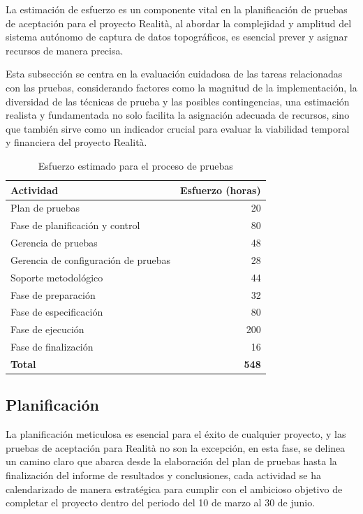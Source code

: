 \documentclass[12pt,a4paper, twoside]{article} %
\begin{document}
La estimación de esfuerzo es un componente vital en la planificación de pruebas de aceptación para el proyecto Realità, al abordar la complejidad y amplitud del sistema autónomo de captura de datos topográficos, es esencial prever y asignar recursos de manera precisa.

Esta subsección se centra en la evaluación cuidadosa de las tareas relacionadas con las pruebas, considerando factores como la magnitud de la implementación, la diversidad de las técnicas de prueba y las posibles contingencias, una estimación realista y fundamentada no solo facilita la asignación adecuada de recursos, sino que también sirve como un indicador crucial para evaluar la viabilidad temporal y financiera del proyecto Realità.

\begin{table}[h]
\centering
\begin{tabular}{|l |r|}
\hline
\textbf{Actividad} & \textbf{Esfuerzo (horas)} \\
\hline
Plan de pruebas & 20 \\
Fase de planificación y control & 80 \\
Gerencia de pruebas & 48 \\
Gerencia de configuración de pruebas & 28 \\
Soporte metodológico & 44 \\
Fase de preparación & 32 \\
Fase de especificación & 80 \\
Fase de ejecución & 200 \\
Fase de finalización & 16 \\
\hline
\textbf{Total} & \textbf{548} \\
\hline
\end{tabular}
\caption{Esfuerzo estimado para el proceso de pruebas}
\label{tab:estimated_effort}
\end{table}


\subsection{Planificación}

La planificación meticulosa es esencial para el éxito de cualquier proyecto, y las pruebas de aceptación para Realità no son la excepción, en esta fase, se delinea un camino claro que abarca desde la elaboración del plan de pruebas hasta la finalización del informe de resultados y conclusiones, cada actividad se ha calendarizado de manera estratégica para cumplir con el ambicioso objetivo de completar el proyecto dentro del periodo del 10 de marzo al 30 de junio.
\end{document}
